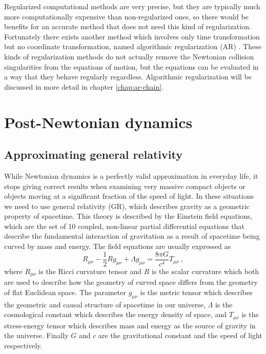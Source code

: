 \documentclass[english, oneside]{HYgradu}
\begin{document}
Regularized computational methods are very precise, but they are typically much more computationally expensive than non-regularized ones, so there would be benefits for an accurate method that does not need this kind of regularization. Fortunately there exists another method which involves only time transformation but no coordinate transformation, named algorithmic regularization (AR) \citep{diplomarbeit}. These kinds of regularization methods do not actually remove the Newtonian collision singularities from the equations of motion, but the equations can be evaluated in a way that they behave regularly regardless. Algorithmic regularization will be discussed in more detail in chapter \ref{chap:ar-chain}.



\section{Post-Newtonian dynamics} \label{sect:pndynam}

\subsection{Approximating general relativity}

While Newtonian dynamics is a perfectly valid approximation in everyday life, it stops giving correct results when examining very massive compact objects or objects moving at a significant fraction of the speed of light. In these situations we need to use general relativity (GR), which describes gravity as a geometric property of spacetime. This theory is described by the Einstein field equations, which are the set of 10 coupled, non-linear partial differential equations that describe the fundamental interaction of gravitation as a result of spacetime being curved by mass and energy. The field equations are usually expressed as
\begin{equation}
R_{\mu \nu} - \frac{1}{2}R g_{\mu \nu} + \Lambda g_{\mu \nu} = \frac{8 \pi G}{c^4} T_{\mu \nu} \ ,
\end{equation}
where $R_{\mu \nu}$ is the Ricci curvature tensor and $R$ is the scalar curvature which both are used to describe how the geometry of curved space differs from the geometry of flat Euclidean space. The parameter $g_{\mu \nu}$ is the metric tensor which describes the geometric and causal structure of spacetime in our universe, $\Lambda$ is the cosmological constant which describes the energy density of space, and $T_{\mu \nu}$ is the stress-energy tensor which describes mass and energy as the source of gravity in the universe. Finally $G$ and $c$ are the gravitational constant and the speed of light respectively.
\end{document}
